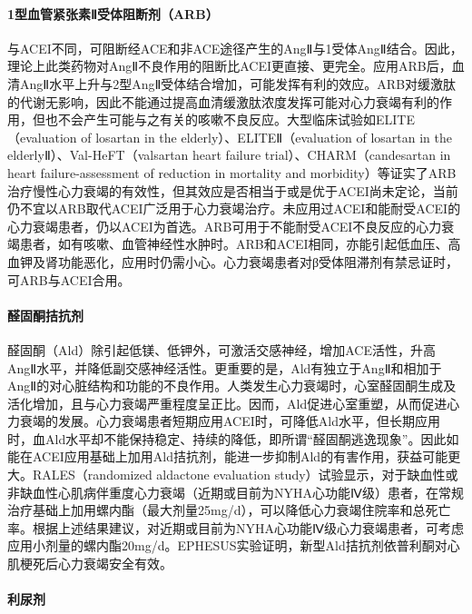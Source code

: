 \paragraph{1型血管紧张素Ⅱ受体阻断剂（ARB）}

与ACEI不同，可阻断经ACE和非ACE途径产生的AngⅡ与1受体AngⅡ结合。因此，理论上此类药物对AngⅡ不良作用的阻断比ACEI更直接、更完全。应用ARB后，血清AngⅡ水平上升与2型AngⅡ受体结合增加，可能发挥有利的效应。ARB对缓激肽的代谢无影响，因此不能通过提高血清缓激肽浓度发挥可能对心力衰竭有利的作用，但也不会产生可能与之有关的咳嗽不良反应。大型临床试验如ELITE
（evaluation of losartan in the elderly）、ELITEⅡ（evaluation of
losartan in the elderlyⅡ）、Val-HeFT（valsartan heart failure
trial）、CHARM（candesartan in heart failure-assessment of reduction in
mortality and
morbidity）等证实了ARB治疗慢性心力衰竭的有效性，但其效应是否相当于或是优于ACEI尚未定论，当前仍不宜以ARB取代ACEI广泛用于心力衰竭治疗。未应用过ACEI和能耐受ACEI的心力衰竭患者，仍以ACEI为首选。ARB可用于不能耐受ACEI不良反应的心力衰竭患者，如有咳嗽、血管神经性水肿时。ARB和ACEI相同，亦能引起低血压、高血钾及肾功能恶化，应用时仍需小心。心力衰竭患者对β受体阻滞剂有禁忌证时，可ARB与ACEI合用。

\paragraph{醛固酮拮抗剂}

醛固酮（Ald）除引起低镁、低钾外，可激活交感神经，增加ACE活性，升高AngⅡ水平，并降低副交感神经活性。更重要的是，Ald有独立于AngⅡ和相加于AngⅡ的对心脏结构和功能的不良作用。人类发生心力衰竭时，心室醛固酮生成及活化增加，且与心力衰竭严重程度呈正比。因而，Ald促进心室重塑，从而促进心力衰竭的发展。心力衰竭患者短期应用ACEI时，可降低Ald水平，但长期应用时，血Ald水平却不能保持稳定、持续的降低，即所谓“醛固酮逃逸现象”。因此如能在ACEI应用基础上加用Ald拮抗剂，能进一步抑制Ald的有害作用，获益可能更大。RALES（randomized
aldactone evaluation
study）试验显示，对于缺血性或非缺血性心肌病伴重度心力衰竭（近期或目前为NYHA心功能Ⅳ级）患者，在常规治疗基础上加用螺内酯（最大剂量25mg/d），可以降低心力衰竭住院率和总死亡率。根据上述结果建议，对近期或目前为NYHA心功能Ⅳ级心力衰竭患者，可考虑应用小剂量的螺内酯20mg/d。EPHESUS实验证明，新型Ald拮抗剂依普利酮对心肌梗死后心力衰竭安全有效。

\paragraph{利尿剂}

